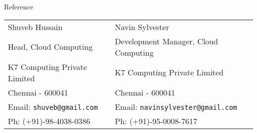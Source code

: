 \documentclass{resume}
\begin{document}

\begin{category}{Reference}
  \citemnobullet \\
  \begin{tabular}{ll}Shuveb Hussain&Navin Sylvester\\
    Head, Cloud Computing&Development Manager, Cloud Computing\\
    K7 Computing Private Limited&K7 Computing Private Limited\\
    Chennai - 600041&Chennai - 600041\\
    Email: \mbox{\small\tt shuveb@gmail.com}&Email: \mbox{\small\tt navinsylvester@gmail.com}\\
    Ph: (+91)-98-4038-0386&Ph: (+91)-95-0008-7617
  \end{tabular}
\end{category}
\end{document}
